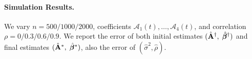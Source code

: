 \documentclass[10pt]{notes}
\begin{document}
\paragraph{Simulation Results.} We vary $n=500/1000/2000$, coefficients $\mathcal{A}_1(t),\dots,\mathcal{A}_4(t)$, and correlation $\rho=0/0.3/0.6/0.9$. We report the error of both initial estimates $(\hat{\mathbf{A}}^\dagger,\;\hat{\bm{\beta}}^\dagger)$ and final estimates $(\hat{\mathbf{A}}^*,\;\hat{\bm{\beta}}^*)$, also the error of $(\hat{\sigma}^2, \hat{\rho})$.


\end{document}
